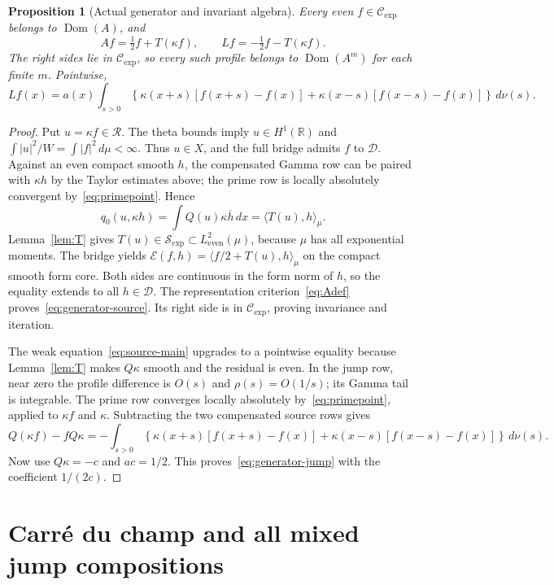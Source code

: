 \documentclass[11pt,a4paper]{article}
\numberwithin{equation}{section}
\newtheorem{proposition}[theorem]{Proposition}
\theoremstyle{definition}
\theoremstyle{remark}
\newcommand{\R}{\mathbb R}
\newcommand{\E}{\mathcal E}
\newcommand{\D}{\mathcal D}
\newcommand{\He}{L^2_{\mathrm{even}}(\mu)}
\newcommand{\dom}{\operatorname{Dom}}
\newcommand{\ip}[2]{\langle #1,#2\rangle}
\newcommand{\RR}{\mathcal R}
\newcommand{\SSS}{\mathcal S_{\!\exp}}
\newcommand{\CE}{\mathcal C_{\exp}}
\begin{document}
\begin{proposition}[Actual generator and invariant algebra]\label{prop:generator}
Every even $f\in\CE$ belongs to $\dom(A)$, and
\begin{equation}\label{eq:generator-source}
 Af=\tfrac12f+T(\kappa f),\qquad
 Lf=-\tfrac12f-T(\kappa f).
\end{equation}
The right sides lie in $\CE$, so every such profile belongs to $\dom(A^m)$ for each finite $m$. Pointwise,
\begin{equation}\label{eq:generator-jump}
 Lf(x)=a(x)\int_{s>0}\!
 \left\{\kappa(x+s)[f(x+s)-f(x)]
       +\kappa(x-s)[f(x-s)-f(x)]\right\}\,d\nu(s).
\end{equation}
\end{proposition}
\begin{proof}
Put $u=\kappa f\in\RR$. The theta bounds imply $u\in H^1(\R)$ and
$\int |u|^2/W=\int |f|^2\,d\mu<\infty$. Thus $u\in X$, and the full bridge admits $f$ to $\D$. Against an even compact smooth $h$, the compensated Gamma row can be paired with $\kappa h$ by the Taylor estimates above; the prime row is locally absolutely convergent by~\eqref{eq:primepoint}. Hence
\[
 q_0(u,\kappa h)=\int Q(u)\kappa\overline h\,dx
                =\ip{T(u)}h_\mu.
\]
Lemma~\ref{lem:T} gives $T(u)\in\SSS\subset\He$, because $\mu$ has all exponential moments. The bridge yields
$\E(f,h)=\ip{f/2+T(u)}h_\mu$ on the compact smooth form core. Both sides are continuous in the form norm of $h$, so the equality extends to all $h\in\D$. The representation criterion~\eqref{eq:Adef} proves~\eqref{eq:generator-source}. Its right side is in $\CE$, proving invariance and iteration.

The weak equation~\eqref{eq:source-main} upgrades to a pointwise equality because Lemma~\ref{lem:T} makes $Q\kappa$ smooth and the residual is even. In the jump row, near zero the profile difference is $O(s)$ and $\rho(s)=O(1/s)$; its Gamma tail is integrable. The prime row converges locally absolutely by~\eqref{eq:primepoint}, applied to $\kappa f$ and $\kappa$. Subtracting the two compensated source rows gives
\[
 Q(\kappa f)-fQ\kappa
  =-\int_{s>0}\!\left\{\kappa(x+s)[f(x+s)-f(x)]
             +\kappa(x-s)[f(x-s)-f(x)]\right\}\,d\nu(s).
\]
Now use $Q\kappa=-c$ and $ac=1/2$. This proves~\eqref{eq:generator-jump} with the coefficient $1/(2c)$.
\end{proof}

\section{Carr\'e du champ and all mixed jump compositions}\label{sec:carre}
\end{document}
